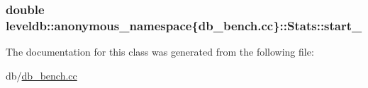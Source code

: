 \subsubsection[{start\+\_\+}]{\setlength{\rightskip}{0pt plus 5cm}double leveldb\+::anonymous\+\_\+namespace\{db\+\_\+bench.\+cc\}\+::Stats\+::start\+\_\+\hspace{0.3cm}{\ttfamily [private]}}\label{classleveldb_1_1anonymous__namespace_02db__bench_8cc_03_1_1_stats_ab917bded97f65cd70987a93308aad419}


The documentation for this class was generated from the following file\+:\begin{DoxyCompactItemize}
\item 
db/\hyperlink{db__bench_8cc}{db\+\_\+bench.\+cc}\end{DoxyCompactItemize}
